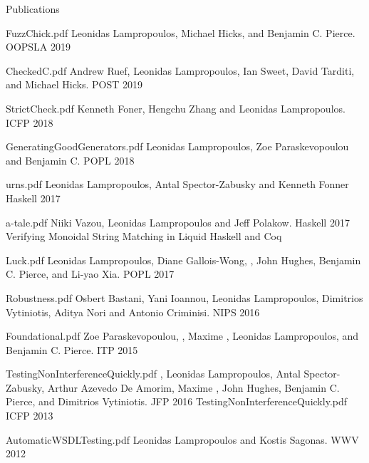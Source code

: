 \documentclass{resume} %
\begin{document}
\begin{rSection}{Publications}

    {FuzzChick.pdf}
    {Leonidas Lampropoulos, Michael Hicks, and Benjamin C. Pierce.}
    {OOPSLA 2019}
    
    {CheckedC.pdf}
    {Andrew Ruef, Leonidas Lampropoulos, Ian Sweet, David Tarditi, and Michael Hicks.}
    {POST 2019}

    {StrictCheck.pdf}
    {Kenneth Foner, Hengchu Zhang and Leonidas Lampropoulos.}
    {ICFP 2018}

    {GeneratingGoodGenerators.pdf}
    {Leonidas Lampropoulos, Zoe Paraskevopoulou and Benjamin C.}
    {POPL 2018}

    {urns.pdf}
    {Leonidas Lampropoulos, Antal Spector-Zabusky and Kenneth Fonner}
    {Haskell 2017}

    {a-tale.pdf}
    {Niiki Vazou, Leonidas Lampropoulos and Jeff Polakow.}
    {Haskell 2017}
    {Verifying Monoidal String Matching in Liquid Haskell and Coq}

    {Luck.pdf}
    {Leonidas Lampropoulos, Diane Gallois-Wong, \Catalin \Hritcu, John Hughes, Benjamin C. Pierce, and Li-yao Xia.}
    {POPL 2017}

    {Robustness.pdf}
    {Osbert Bastani, Yani Ioannou, Leonidas Lampropoulos, Dimitrios Vytiniotis, Aditya Nori and Antonio Criminisi.}
    {NIPS 2016}

    {Foundational.pdf}
    {Zoe Paraskevopoulou, \Catalin \Hritcu, Maxime \Denes, Leonidas Lampropoulos, and Benjamin C. Pierce.}
    {ITP 2015}
    
    {TestingNonInterferenceQuickly.pdf}
    {\Catalin \Hritcu, Leonidas Lampropoulos, Antal Spector-Zabusky, Arthur
    Azevedo De Amorim, Maxime \Denes, John Hughes, Benjamin C. Pierce, and Dimitrios
    Vytiniotis.}
    {JFP 2016}
    {TestingNonInterferenceQuickly.pdf}
    {ICFP 2013}
%

    {AutomaticWSDLTesting.pdf}
    {Leonidas Lampropoulos and Kostis Sagonas.}
    {WWV 2012}
   
\end{rSection}
\end{document}
